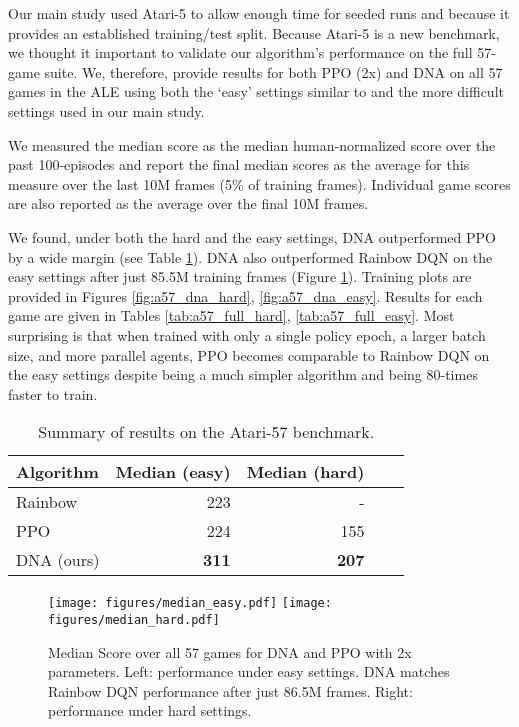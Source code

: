 \documentclass{article}
\begin{document}
Our main study used Atari-5 to allow enough time for seeded runs and because it provides an established training/test split. Because Atari-5 is a new benchmark, we thought it important to validate our algorithm's performance on the full 57-game suite. We, therefore, provide results for both PPO (2x) and DNA on all 57 games in the ALE using both the `easy' settings similar to \cite{hessel2018rainbow} and the more difficult settings used in our main study. 

We measured the median score as the median human-normalized score over the past 100-episodes and report the final median scores as the average for this measure over the last 10M frames (5\% of training frames). Individual game scores are also reported as the average over the final 10M frames.

We found, under both the hard and the easy settings, DNA outperformed PPO by a wide margin (see Table \ref{tab:a57_summary}). DNA also outperformed Rainbow DQN on the easy settings after just 85.5M training frames (Figure \ref{fig:a57_median_plot}). Training plots are provided in Figures \ref{fig:a57_dna_hard}, \ref{fig:a57_dna_easy}. Results for each game are given in Tables \ref{tab:a57_full_hard}, \ref{tab:a57_full_easy}. Most surprising is that when trained with only a single policy epoch, a larger batch size, and more parallel agents, PPO becomes comparable to Rainbow DQN on the easy settings despite being a much simpler algorithm and being 80-times faster to train.

\begin{table}[h]
    \centering
    \caption{Summary of results on the Atari-57 benchmark.}
    \begin{tabular}{l r r r r}
    \toprule
         Algorithm &  Median (easy) & Median (hard) \\
    \midrule
         Rainbow & 223 & - \\
         PPO & 224 & 155 \\
         DNA (ours) & \textbf{311} & \textbf{207}\\
    \bottomrule
    \end{tabular}
    \label{tab:a57_summary}
\end{table}

\begin{figure}[h]
    \centering
    \texttt{[image: figures/median\_easy.pdf]}
    \texttt{[image: figures/median\_hard.pdf]}
    \caption{Median Score over all 57 games for DNA and PPO with 2x parameters. Left: performance under easy settings. DNA matches Rainbow DQN performance after just 86.5M frames. Right: performance under hard settings.}
    \label{fig:a57_median_plot}
\end{figure}
\end{document}
